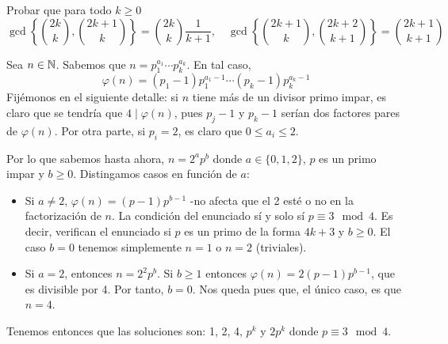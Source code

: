 \documentclass[twoside]{article}
\begin{document}
\begin{ejercicio}{2}
Probar que para todo $k\geq 0$
\[
\gcd \left\{\binom{2k}{k},\binom{2k+1}{k}\right\}=\binom{2k}{k}\frac{1}{k+1}, \quad \gcd \left\{\binom{2k+1}{k},\binom{2k+2}{k+1}\right\}=\binom{2k+1}{k+1}
\]
\begin{sol}
Sea $n\in \mathbb{N}$. Sabemos que $n=p_1^{a_1}\cdots p_k^{a_k}$. En tal caso, 
\[
\varphi(n) = (p_1-1)p_1^{a_1-1}\cdots(p_k-1)p_k^{a_k-1}
\]
Fijémonos en el siguiente detalle: si $n$ tiene más de un divisor primo impar, es claro que se tendría que $4\mid \varphi(n)$, pues $p_j -1$ y $p_k-1$ serían dos factores pares de $\varphi(n)$. Por otra parte, si $p_i=2$, es claro que $0\leq a_i \leq 2$. 

Por lo que sabemos hasta ahora, $n = 2^a p^b$ donde $a\in\{0,1,2\}$, $p$ es un primo impar y $b\geq 0$. Distingamos casos en función de $a$:
\begin{itemize}
\item Si $a\neq 2$, $\varphi(n) = (p-1)p^{b-1}$ -no afecta que el 2 esté o no en la factorización de $n$. La condición del enunciado sí y solo sí $p \equiv 3 \mod 4$. Es decir, verifican el enunciado si $p$ es un primo de la forma $4k + 3$ y $b\geq 0$. El caso $b=0$ tenemos simplemente $n=1$ o $n=2$ (triviales).
\item Si $a=2$, entonces $n=2^2p^b$. Si $b\geq 1$ entonces $\varphi(n)=2(p-1)p^{b-1}$, que es divisible por 4. Por tanto, $b=0$. Nos queda pues que, el único caso, es que $n=4$.
\end{itemize}
Tenemos entonces que las soluciones son: 1, 2, 4, $p^k$ y $2p^k$ donde $p \equiv 3 \mod 4$.
\end{sol}
\end{ejercicio}
\end{document}
